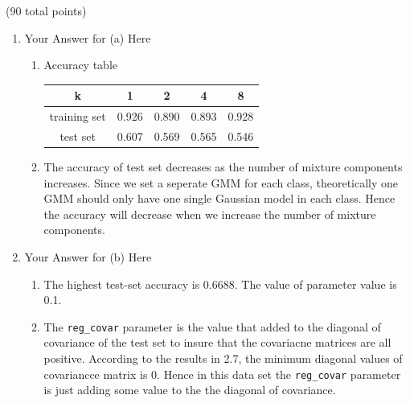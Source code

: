 \documentclass[12pt]{article}
\begin{document}
\begin{question}{(90 total points) \qTwoTitle}
\begin{subquestion}
  \begin{answerbox}{0.65\textheight}
    \begin{enumerate}
    \item Your Answer for (a) Here\hfill
      \begin{enumerate}
      \item Accuracy table
        \begin{center}
        \begin{tabular}{c|c|c|c|c} \hline
            k&1&2&4&8 \\ \hline
             training set&0.926&0.890&0.893&0.928 \\ \hline
             test set&0.607&0.569&0.565&0.546 \\ \hline
        \end{tabular}
        \end{center}
      \item The accuracy of test set decreases as the number of mixture components increases. Since we set a seperate GMM for each class, theoretically one GMM should only have one single Gaussian model in each class. Hence the accuracy will decrease when we increase the number of mixture components.
      \end{enumerate}
    \item  Your Answer for (b) Here\hfill
      \begin{enumerate}
      \item The highest test-set accuracy is 0.6688. The value of parameter value is 0.1.
      \item The {\tt reg\_covar} parameter is the value that added to the diagonal of covariance of the test set to insure that the covariacne matrices are all positive. According to the results in 2.7, the minimum diagonal values of covariancce matrix is 0. Hence in this data set the {\tt reg\_covar} parameter is just adding some value to the the diagonal of covariance.
      \end{enumerate}
    \end{enumerate}
  \end{answerbox}
  


\end{subquestion}

\end{question}
\end{document}
